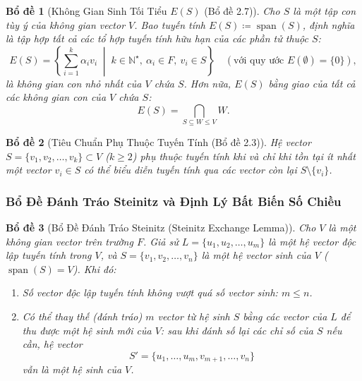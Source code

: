 \documentclass{article}
\newtheorem{bode}{Bổ đề}
\begin{document}
\begin{bode}[Không Gian Sinh Tối Tiểu $E(S)$ (Bổ đề 2.7)]
Cho $S$ là một tập con tùy ý của không gian vector $V$. Bao tuyến tính $E(S) \coloneqq \operatorname{span}(S)$, định nghĩa là tập hợp tất cả các tổ hợp tuyến tính hữu hạn của các phần tử thuộc $S$:
\begin{equation}
    E(S) = \left\{ \sum_{i=1}^k \alpha_i v_i \;\middle|\; k \in \mathbb{N}^\star, \ \alpha_i \in F, \ v_i \in S \right\} \quad (\text{với quy ước } E(\emptyset) = \{0\}),
\end{equation}
là không gian con nhỏ nhất của $V$ chứa $S$. Hơn nữa, $E(S)$ bằng giao của tất cả các không gian con của $V$ chứa $S$:
\begin{equation}
    E(S) = \bigcap_{S \subseteq W \le V} W.
\end{equation}
\end{bode}

\begin{bode}[Tiêu Chuẩn Phụ Thuộc Tuyến Tính (Bổ đề 2.3)]
Hệ vector $S = \{v_1, v_2, \dots, v_k\} \subset V$ ($k \ge 2$) phụ thuộc tuyến tính khi và chỉ khi tồn tại ít nhất một vector $v_i \in S$ có thể biểu diễn tuyến tính qua các vector còn lại $S \setminus \{v_i\}$.
\end{bode}

\subsubsection*{Bổ Đề Đánh Tráo Steinitz và Định Lý Bất Biến Số Chiều}

\begin{bode}[Bổ Đề Đánh Tráo Steinitz (Steinitz Exchange Lemma)]
Cho $V$ là một không gian vector trên trường $F$. Giả sử $L = \{u_1, u_2, \dots, u_m\}$ là một hệ vector độc lập tuyến tính trong $V$, và $S = \{v_1, v_2, \dots, v_n\}$ là một hệ vector sinh của $V$ ($\operatorname{span}(S) = V$). Khi đó:
\begin{enumerate}
    \item Số vector độc lập tuyến tính không vượt quá số vector sinh: $m \le n$.
    \item Có thể thay thế (đánh tráo) $m$ vector từ hệ sinh $S$ bằng các vector của $L$ để thu được một hệ sinh mới của $V$: sau khi đánh số lại các chỉ số của $S$ nếu cần, hệ vector
    \begin{equation}
        S' = \{u_1, \dots, u_m, v_{m+1}, \dots, v_n\}
    \end{equation}
    vẫn là một hệ sinh của $V$.
\end{enumerate}
\end{bode}
\end{document}
